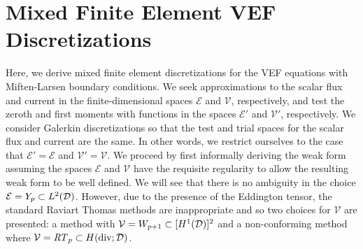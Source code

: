 \documentclass[../doc.tex]{subfiles}
\begin{document}
\chapter{Mixed Finite Element VEF Discretizations}
Here, we derive mixed finite element discretizations for the VEF equations with Miften-Larsen boundary conditions. We seek approximations to the scalar flux and current in the finite-dimensional spaces $\mathcal{E}$ and $\mathcal{V}$, respectively, and test the zeroth and first moments with functions in the spaces $\mathcal{E}'$ and $\mathcal{V}'$, respectively. We consider Galerkin discretizations so that the test and trial spaces for the scalar flux and current are the same. In other words, we restrict ourselves to the case that $\mathcal{E}' = \mathcal{E}$ and $\mathcal{V}' = \mathcal{V}$. We proceed by first informally deriving the weak form assuming the spaces $\mathcal{E}$ and $\mathcal{V}$ have the requisite regularity to allow the resulting weak form to be well defined. We will see that there is no ambiguity in the choice $\mathcal{E} = Y_p \subset L^2(\mathcal{D})$. However, due to the presence of the Eddington tensor, the standard Raviart Thomas methods are inappropriate and so two choices for $\mathcal{V}$ are presented: a method with $\mathcal{V} = W_{p+1} \subset [H^1(\mathcal{D})]^2$ and a non-conforming method where $\mathcal{V} = \mathit{RT}_p\subset H(\operatorname{div};\mathcal{D})$. 
\end{document}
